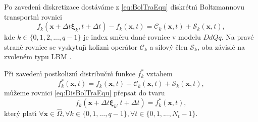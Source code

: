             
           
        Po zaveden\'{\i} diskretizace dost\'{a}v\'{a}me z \eqref{eq:BolTraEqu} diskr\'{e}tn\'{\i} Boltzmannovu transportn\'{\i} rovnici
        \begin{equation}
            \label{eq:DisBolTraEqu}
              f_k(\boldsymbol{x} + \Delta t \boldsymbol{\xi}_k, t + \Delta t) - f_k(\boldsymbol{x},t) = \mathcal{C}_k(\boldsymbol{x},t) + \mathcal{S}_k(\boldsymbol{x},t),
        \end{equation}
        kde $k \in \{ 0,1,2,...,q-1 \}$ je index sm\v{e}ru dan\'{e} rovnice v modelu $DdQq$. Na prav\'{e} stran\v{e} rovnice se vyskytuj\'{\i} kolizn\'{\i} oper\'{a}tor $\mathcal{C}_k$ a silov\'{y} \v{c}len $\mathcal{S}_k$, oba z\'{a}visl\'{e} na zvolen\'{e}m typu LBM \cite{kruger2017lattice, geier2015cumulant,guo2013lattice}. 

        P\v{r}i zaveden\'{\i} postkolizn\'{\i} distribu\v{c}n\'{\i} funkce $f_{k}^{*}$ vztahem
        \begin{equation}
            \label{eq:PosColFun}
                f_{k}^{*}(\boldsymbol{x},t) = f_{k}(\boldsymbol{x},t) + \mathcal{C}_k(\boldsymbol{x},t) + \mathcal{S}_k(\boldsymbol{x},t),
        \end{equation}
        m\r{u}\v{z}eme rovnici \eqref{eq:DisBolTraEqu} p\v{r}epsat do tvaru 
        \begin{equation}
            \label{eq:UpdDisBolEqu}    
                f_k(\boldsymbol{x} + \Delta t \boldsymbol{\xi}_k, t + \Delta t) = f_{k}^{*}(\boldsymbol{x},t),
        \end{equation}
        kter\'{y} plat\'{\i} $\forall \boldsymbol{x} \in \hat{\Omega}, \forall k \in \{ 0,1,...,q-1 \}, \forall t \in \{ 0,1,...,N_{t}-1 \}$.

